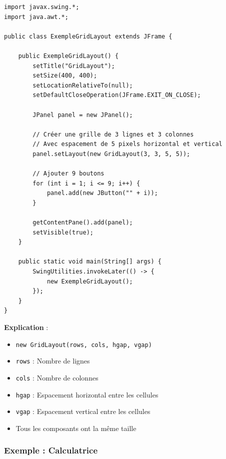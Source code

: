 \documentclass[11pt,a4paper]{article}
\begin{document}
\begin{lstlisting}
import javax.swing.*;
import java.awt.*;

public class ExempleGridLayout extends JFrame {
    
    public ExempleGridLayout() {
        setTitle("GridLayout");
        setSize(400, 400);
        setLocationRelativeTo(null);
        setDefaultCloseOperation(JFrame.EXIT_ON_CLOSE);
        
        JPanel panel = new JPanel();
        
        // Créer une grille de 3 lignes et 3 colonnes
        // Avec espacement de 5 pixels horizontal et vertical
        panel.setLayout(new GridLayout(3, 3, 5, 5));
        
        // Ajouter 9 boutons
        for (int i = 1; i <= 9; i++) {
            panel.add(new JButton("" + i));
        }
        
        getContentPane().add(panel);
        setVisible(true);
    }
    
    public static void main(String[] args) {
        SwingUtilities.invokeLater(() -> {
            new ExempleGridLayout();
        });
    }
}
\end{lstlisting}

\textbf{Explication} :
\begin{itemize}
    \item \texttt{new GridLayout(rows, cols, hgap, vgap)}
    \item \texttt{rows} : Nombre de lignes
    \item \texttt{cols} : Nombre de colonnes
    \item \texttt{hgap} : Espacement horizontal entre les cellules
    \item \texttt{vgap} : Espacement vertical entre les cellules
    \item Tous les composants ont la même taille
\end{itemize}

\subsubsection{Exemple : Calculatrice}
\end{document}

